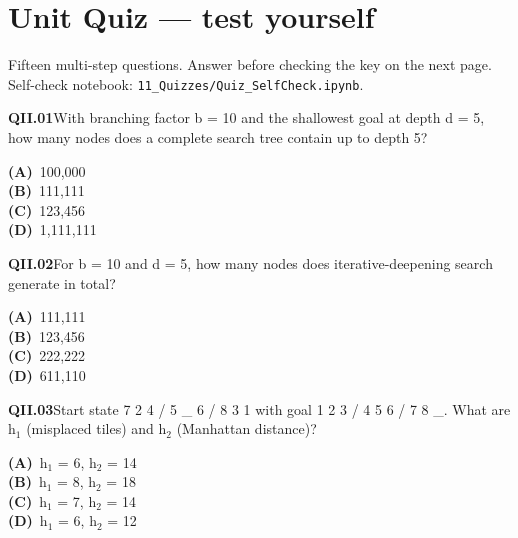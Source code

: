 \section{Unit Quiz --- test yourself}
{\small\color{slate}Fifteen multi-step questions. Answer before checking the key on the next page. Self-check notebook: \texttt{11\_Quizzes/Quiz\_SelfCheck.ipynb}.}\par\medskip
\begin{tcolorbox}[enhanced,breakable,colback=white,colframe=navyL,arc=2mm,boxrule=0.7pt,left=3mm,right=3mm,top=2mm,bottom=2mm]
\textbf{\color{navy}QII.01}\quad With branching factor b = 10 and the shallowest goal at depth d = 5, how many nodes does a complete search tree contain up to depth 5?\hfill{}\par\smallskip
{\small \textbf{\color{navyL}(A)}\ 100,000\\[1pt]\textbf{\color{navyL}(B)}\ 111,111\\[1pt]\textbf{\color{navyL}(C)}\ 123,456\\[1pt]\textbf{\color{navyL}(D)}\ 1,111,111}
\end{tcolorbox}
\begin{tcolorbox}[enhanced,breakable,colback=white,colframe=navyL,arc=2mm,boxrule=0.7pt,left=3mm,right=3mm,top=2mm,bottom=2mm]
\textbf{\color{navy}QII.02}\quad For b = 10 and d = 5, how many nodes does iterative-deepening search generate in total?\hfill{}\par\smallskip
{\small \textbf{\color{navyL}(A)}\ 111,111\\[1pt]\textbf{\color{navyL}(B)}\ 123,456\\[1pt]\textbf{\color{navyL}(C)}\ 222,222\\[1pt]\textbf{\color{navyL}(D)}\ 611,110}
\end{tcolorbox}
\begin{tcolorbox}[enhanced,breakable,colback=white,colframe=navyL,arc=2mm,boxrule=0.7pt,left=3mm,right=3mm,top=2mm,bottom=2mm]
\textbf{\color{navy}QII.03}\quad Start state 7 2 4 / 5 \_ 6 / 8 3 1 with goal 1 2 3 / 4 5 6 / 7 8 \_. What are h$_1$ (misplaced tiles) and h$_2$ (Manhattan distance)?\hfill{}\par\smallskip
{\small \textbf{\color{navyL}(A)}\ h$_1$ = 6, h$_2$ = 14\\[1pt]\textbf{\color{navyL}(B)}\ h$_1$ = 8, h$_2$ = 18\\[1pt]\textbf{\color{navyL}(C)}\ h$_1$ = 7, h$_2$ = 14\\[1pt]\textbf{\color{navyL}(D)}\ h$_1$ = 6, h$_2$ = 12}
\end{tcolorbox}
